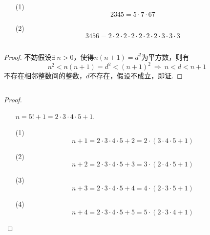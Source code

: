 \documentclass[UTF8]{ctexart}
\begin{document}
\subsection{}   %
\begin{enumerate}
    \item [(1)]
    \[
        2345 = 5 \cdot  7 \cdot  67
    \]  
    \item [(2)]
    \[
        3456 = 2 \cdot  2 \cdot  2 \cdot  2 \cdot  2 \cdot  2 \cdot  2 \cdot  3 \cdot  3 \cdot  3
    \]
\end{enumerate}

\subsection{}   %
\begin{proof}
    不妨假设$\exists\ n>0$，使得$n(n+1)=d^2$为平方数，则有
    \[
        n^2 < n(n+1) = d^2 < {(n+1)}^2
        \ \Rightarrow\ 
        n<d<n+1
    \]
    不存在相邻整数间的整数，$d$不存在，假设不成立，即证.
\end{proof}

\subsection{}   %
\begin{proof}
    \begin{enumerate}
        \item []$n=5!+1=2\cdot 3 \cdot 4 \cdot 5 + 1$.
        \item [(1)]
        \[
            n+1 
            = 2 \cdot 3 \cdot 4 \cdot 5 + 2
            = 2 \cdot (3 \cdot 4 \cdot 5 + 1)
        \]
        \item [(2)]
        \[
            n+2 
            = 2 \cdot 3 \cdot 4 \cdot 5 + 3
            = 3 \cdot (2 \cdot 4 \cdot 5 + 1)
        \]
        \item [(3)]
        \[
            n+3 
            = 2 \cdot 3 \cdot 4 \cdot 5 + 4
            = 4 \cdot (2 \cdot 3 \cdot 5 + 1)
        \]
        \item [(4)]
        \[
            n+4 
            = 2 \cdot 3 \cdot 4 \cdot 5 + 5
            = 5 \cdot (2 \cdot 3 \cdot 4 + 1)
        \]
    \end{enumerate}
\end{proof}
\end{document}
